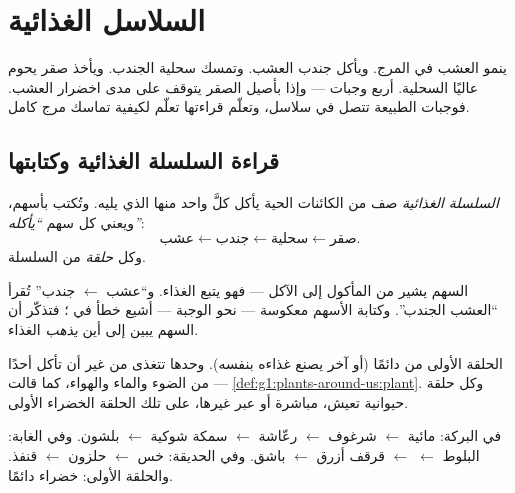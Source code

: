 \chapter{السلاسل الغذائية}\label{ch:g3:food-chains}

ينمو العشب في المرج. ويأكل جندب العشب. وتمسك سحلية الجندب. ويأخذ
صقر يحوم عاليًا السحلية. أربع وجبات --- وإذا بأصيل الصقر يتوقف
على مدى اخضرار العشب. فوجبات الطبيعة تتصل في سلاسل، وتعلّم
قراءتها تعلّم لكيفية تماسك مرج كامل.

\section{قراءة السلسلة الغذائية وكتابتها}

\begin{definition}\label{def:g3:food-chains:chain}
\emph{السلسلة الغذائية} صف من الكائنات الحية
يأكل كلَّ واحد منها الذي يليه. وتُكتب بأسهم، ويعني كل سهم
\emph{``يأكله''}:
\[
\text{عشب} \longleftarrow \text{جندب}
\longleftarrow \text{سحلية} \longleftarrow \text{صقر}.
\]
وكل  \emph{حلقة} من السلسلة.
\end{definition}

\begin{remark}\label{rem:g3:food-chains:arrow}
السهم يشير من المأكول إلى الآكل --- فهو يتبع الغذاء. و``عشب
$\leftarrow$ جندب'' تُقرأ ``العشب  الجندب''. وكتابة الأسهم
معكوسة --- نحو الوجبة --- أشيع خطأ في ؛ فتذكّر أن
السهم يبين إلى أين \emph{يذهب} الغذاء.
\end{remark}

\begin{proposition}\label{prop:g3:food-chains:start}
الحلقة الأولى من   دائمًا (أو  آخر يصنع
غذاءه بنفسه).  وحدها تتغذى من غير أن تأكل أحدًا --- من
الضوء والماء والهواء، كما قالت
\cref{def:g1:plants-around-us:plant}. وكل حلقة حيوانية تعيش،
مباشرة أو عبر غيرها، على تلك الحلقة الخضراء الأولى.
\end{proposition}
\admitted

\begin{example}\label{ex:g3:food-chains:three}
في البركة:  مائية $\leftarrow$ شرغوف $\leftarrow$
 رعّاشة $\leftarrow$ سمكة شوكية $\leftarrow$ بلشون.
وفي الغابة:  البلوط $\leftarrow$ 
$\leftarrow$ قرقف أزرق $\leftarrow$ باشق. وفي
الحديقة: خس $\leftarrow$ حلزون $\leftarrow$ قنفذ. والحلقة
الأولى: خضراء دائمًا.
\end{example}

